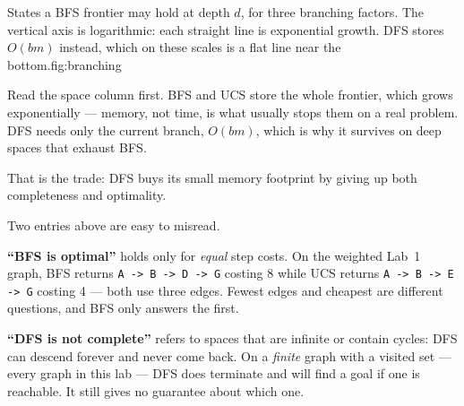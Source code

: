 \begin{aifig}{States a BFS frontier may hold at depth $d$, for
three branching factors. The vertical axis is logarithmic: each straight line is exponential
growth. DFS stores $O(bm)$ instead, which on these scales is a flat line near the
bottom.}{fig:branching}
\end{aifig}

\begin{keyidea}
Read the space column first. BFS and UCS store the whole frontier, which grows exponentially --- memory, not time, is what usually stops them on a real problem. DFS needs only the current branch, \(O(bm)\), which is why it survives on deep spaces that exhaust BFS.

That is the trade: DFS buys its small memory footprint by giving up both completeness and optimality.
\end{keyidea}

\begin{pitfall}
Two entries above are easy to misread.

\textbf{``BFS is optimal''} holds only for \emph{equal} step costs. On the weighted Lab~1 graph, BFS returns \texttt{A -> B -> D -> G} costing 8 while UCS returns \texttt{A -> B -> E -> G} costing 4 --- both use three edges. Fewest edges and cheapest are different questions, and BFS only answers the first.

\textbf{``DFS is not complete''} refers to spaces that are infinite or contain cycles: DFS can descend forever and never come back. On a \emph{finite} graph with a visited set --- every graph in this lab --- DFS does terminate and will find a goal if one is reachable. It still gives no guarantee about which one.
\end{pitfall}

